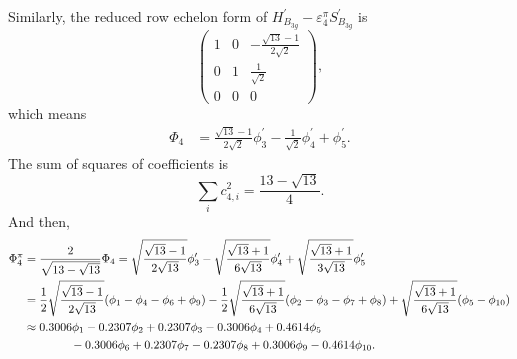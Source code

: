 \documentclass[a4paper]{book}
\newcommand{\Hp}{H^\prime}
\newcommand{\Sp}{S^\prime}
\begin{document}
\begin{solution}
\begin{enumerate}[label=(\alph*)]
		Similarly, the reduced row echelon form of $\Hp_{B_{3g}}-\varepsilon^\pi_4 \Sp_{B_{3g}}$ is
		\begin{equation*}
			\begin{pmatrix}
				1	& 0	&	-\frac{\sqrt{13}-1}{2\sqrt{2}}	\\	0	&	1	&	\frac{1}{\sqrt{2}}	\\	0	&	0	&	0
			\end{pmatrix},
		\end{equation*}		
		which means
		\begin{align*}
			\Phi_4 &= \frac{\sqrt{13}-1}{2\sqrt{2}}\phi^\prime_3 - \frac{1}{\sqrt{2}} \phi^\prime_4 + \phi^\prime_5.
		\end{align*}
		The sum of squares of coefficients is
		\begin{equation*}
			\sum_{i} c^2_{4,i} = \frac{13-\sqrt{13}}{4}.
		\end{equation*}
		And then,
		\begin{align}
			\Phi^\pi_4 &= \frac{2}{\sqrt{13-\sqrt{13}}} \Phi_4 = \sqrt{\frac{\sqrt{13}-1}{2\sqrt{13}}} \phi^\prime_3 - \sqrt{\frac{\sqrt{13}+1}{6\sqrt{13}}} \phi^\prime_4	+ \sqrt{\frac{\sqrt{13}+1}{3\sqrt{13}}} \phi^\prime_5\notag \\
			&= \frac{1}{2}\sqrt{\frac{\sqrt{13}-1}{2\sqrt{13}}}(\phi_1 - \phi_4 - \phi_6 + \phi_9) - \frac{1}{2}\sqrt{\frac{\sqrt{13}+1}{6\sqrt{13}}} (\phi_2 - \phi_3 - \phi_7 + \phi_8) \notag + \sqrt{\frac{\sqrt{13}+1}{6\sqrt{13}}} (\phi_5 -\phi_{10})  \\
			&\approx 0.3006 \phi_1 - 0.2307 \phi_2 + 0.2307 \phi_3 -0.3006 \phi_4 + 0.4614 \phi_5 \notag \\
			&\hspace*{4em} - 0.3006\phi_6 + 0.2307 \phi_7 - 0.2307 \phi_8 + 0.3006 \phi_9 - 0.4614 \phi_{10}.
		\end{align}
		

\end{enumerate}
\end{solution}
\end{document}

